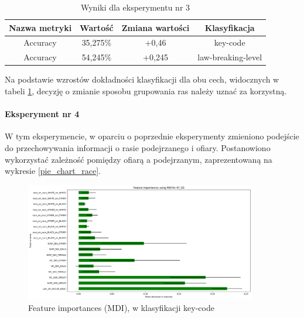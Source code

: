 \documentclass{classrep}
\begin{document}
{{{{                    \begin{table}
                    \centering
                     \begin{tabular}{|c|c|c|c|}
                            \hline
                          Nazwa metryki & Wartość & Zmiana wartości & Klasyfikacja \\ \hline
                            Accuracy &  35,275\% & +0,46 & key-code\\ \hline
                            Accuracy &  54,245\% & +0,245 & law-breaking-level\\ \hline
                        \end{tabular}
                        \caption{Wyniki dla eksperymentu nr 3}
                        \label{goal_1_exp_3_results}
                     \end{table}
                     \FloatBarrier
                    Na podstawie wzrostów dokładności klasyfikacji dla obu cech,
                    widocznych w tabeli \ref{goal_1_exp_3_results}, decyzję o zmianie
                    sposobu grupowania ras należy uznać za korzystną.
                }

                \paragraph{Eksperyment nr 4}{
                    W tym eksperymencie, w oparciu o poprzednie eksperymenty zmieniono
                    podejście do przechowywania informacji o rasie podejrzanego i
                    ofiary. Postanowiono wykorzystać zależność pomiędzy ofiarą a
                    podejrzanym, zaprezentowaną na wykresie \ref{pie_chart_race}.
                    \begin{figure}[!htbp]
                        \centering
                        \includegraphics[width=0.9\textwidth]{img/5.1.3/4/Feature importances using MDI for KY_CD.png}
                        \caption{Feature importances (MDI), w klasyfikacji key-code}
                        \label{goal_1_exp_4_imp_mdi_key}
                    \end{figure}
                    
}}}}
\end{document}
